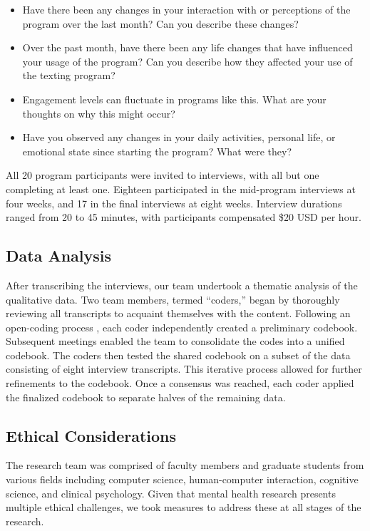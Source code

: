\begin{itemize}
\item Have there been any changes in your interaction with or perceptions of the program over the last month? Can you describe these changes?
\item Over the past month, have there been any life changes that have influenced your usage of the program? Can you describe how they affected your use of the texting program?
\item Engagement levels can fluctuate in programs like this. What are your thoughts on why this might occur?
\item Have you observed any changes in your daily activities, personal life, or emotional state since starting the program? What were they?
\end{itemize}

All 20 program participants were invited to interviews, with all but one completing at least one. Eighteen participated in the mid-program interviews at four weeks, and 17 in the final interviews at eight weeks. Interview durations ranged from 20 to 45 minutes, with participants compensated \$20 USD per hour.


\subsection{Data Analysis}
After transcribing the interviews, our team undertook a thematic analysis \cite{cooper2012apa} of the qualitative data. Two team members, termed ``coders,'' began by thoroughly reviewing all transcripts to acquaint themselves with the content. Following an open-coding process \cite{khandkar2009open}, each coder independently created a preliminary codebook. Subsequent meetings enabled the team to consolidate the codes into a unified codebook.  The coders then tested the shared codebook on a subset of the data consisting of eight interview transcripts. This iterative process allowed for further refinements to the codebook. Once a consensus was reached, each coder applied the finalized codebook to separate halves of the remaining data.

\subsection{Ethical Considerations}
\label{study1_ethics}
The research team was comprised of faculty members and graduate students from various fields including computer science, human-computer interaction, cognitive science, and clinical psychology. Given that  mental health research presents multiple ethical challenges, we took measures to address these at all stages of the research.

